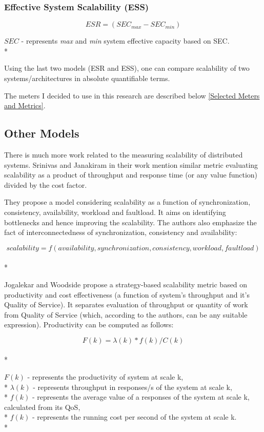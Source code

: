 \documentclass{uvamscse}
\begin{document}
\subsubsection{Effective System Scalability (ESS)}
\begin{center}
  $$ESR = (SEC_{max} - SEC_{min})$$
\end{center}
  \texttt{$SEC$} - represents \textit{max} and \textit{min} system effective capacity based on SEC. \\*

Using the last two models (ESR and ESS), one can compare scalability of two systems/architectures in absolute quantifiable terms.

The meters I decided to use in this research are described below \ref{Selected Meters and Metrics}.

\subsection{Other Models}
There is much more work related to the measuring scalability of distributed systems. Srinivas and Janakiram in their work \cite{SriJan} mention similar metric evaluating scalability as a product of throughput and response time (or any value function) divided by the cost factor.

They propose a model considering scalability as a function of synchronization, consistency, availability, workload and faultload. It aims on identifying bottlenecks and hence improving the scalability. The authors also emphasize the fact of interconnectedness of synchronization, consistency and availability:
\begin{center}
  $$scalability = f(availability, synchronization, consistency ,workload, faultload)$$ \\*
\end{center}

Jogalekar and Woodside \cite{EvaScaDS} propose a strategy-based scalability metric based on productivity and cost effectiveness (a function of system's throughput and it’s Quality of Service). It separates evaluation of throughput or quantity of work from Quality of Service (which, according to the authors, can be any suitable expression). Productivity can be computed as follows:
\begin{center}
  $$F(k) = \lambda(k) * f(k) / C(k)$$ \\*
\end{center}
  \texttt{$F(k)$} - represents the productivity of system at scale k, \\*
  \texttt{$\lambda(k)$} - represents throughput in responses/s of the system at scale k, \\*
  \texttt{$f(k)$} - represents the average value of a responses of the system at scale k, calculated from its QoS, \\*
  \texttt{$f(k)$} - represents the running cost per second of the system at scale k. \\*
\end{document}
